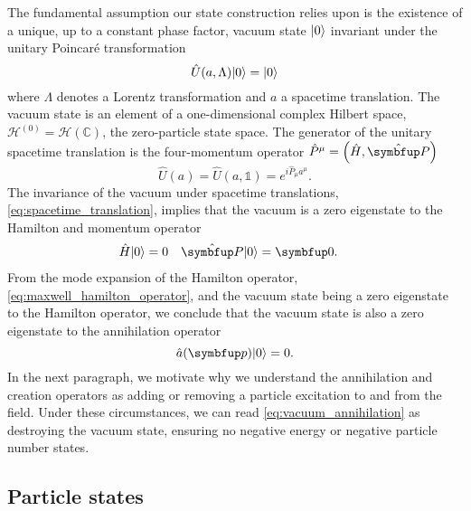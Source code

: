 The fundamental assumption our state construction relies upon is the existence of a unique, up to a constant phase factor, vacuum state $\lvert0\rangle$ invariant under the unitary Poincaré transformation~\cite[p.~97]{Streater2016}
\begin{equation}
	\hat{U}(a,\Lambda)
	\lvert0\rangle
	=
	\lvert0\rangle
	\label{eq:vacuum_invariance}
\end{equation}
where $\Lambda$ denotes a Lorentz transformation and $a$ a spacetime translation.
The vacuum state is an element of a one-dimensional complex Hilbert space, $\mathcal{H}^{(0)}=\mathcal{H}(\mathbb{C})$, the zero-particle state space.
The generator of the unitary spacetime translation is the four-momentum operator $\hat{P}^\mu=\left(\hat{H},\vu{P}\right)$~\cite[p.~28]{Haag2012}
\begin{equation}
	\hat{U}(a)
	=
	\hat{U}(a,\mathbb{1})
	=
	e^{i\hat{P}_\mu a^\mu}
	\label{eq:spacetime_translation}
	.
\end{equation}
The invariance of the vacuum under spacetime translations, \cref{eq:spacetime_translation}, implies that the vacuum is a zero eigenstate to the Hamilton and momentum operator
\begin{align}
	\hat{H}
	\ket{0}
	&=
	0
	&
	\vu{P}
	\ket{0}
	&=
	\vb{0}
	\label{eq:vacuum_energy_momentum}
	.	
\end{align}
From the mode expansion of the Hamilton operator, \cref{eq:maxwell_hamilton_operator}, and the vacuum state being a zero eigenstate to the Hamilton operator, we conclude that the vacuum state is also a zero eigenstate to the annihilation operator
\begin{equation}
	\hat{a}(\vb{p})
	\ket{0}
	=
	0
	\label{eq:vacuum_annihilation}
	.
\end{equation}
In the next paragraph, we motivate why we understand the annihilation and creation operators as adding or removing a particle excitation to and from the field.
Under these circumstances, we can read \cref{eq:vacuum_annihilation} as destroying the vacuum state, ensuring no negative energy or negative particle number states.

\subsection{Particle states}

